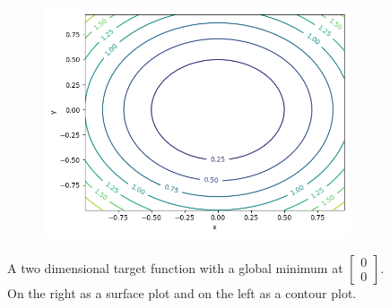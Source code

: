 \begin{figure}[ht!]
    \centering
    \begin{subfigure}{0.48\textwidth}
    \end{subfigure}
    \begin{subfigure}{0.48\textwidth}
        \includegraphics[width=\textwidth]{gfx/Figures/Optimization_Target_Function_Contour.png}
    \end{subfigure}
    \caption{A two dimensional target function with a global minimum at $\begin{bmatrix}0\\0 \end{bmatrix}$. On the right as a surface plot and on the left as a contour plot.}
    \label{fig:theory:target-function}
\end{figure}

